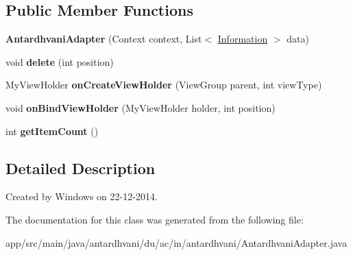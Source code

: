 \subsection*{Public Member Functions}
\begin{DoxyCompactItemize}
\item 
\hypertarget{classantardhvani_1_1du_1_1ac_1_1in_1_1antardhvani_1_1_antardhvani_adapter_a1ea0443eda01dfb34c46a8be5017ef73}{}{\bfseries Antardhvani\+Adapter} (Context context, List$<$ \hyperlink{classantardhvani_1_1du_1_1ac_1_1in_1_1antardhvani_1_1_information}{Information} $>$ data)\label{classantardhvani_1_1du_1_1ac_1_1in_1_1antardhvani_1_1_antardhvani_adapter_a1ea0443eda01dfb34c46a8be5017ef73}

\item 
\hypertarget{classantardhvani_1_1du_1_1ac_1_1in_1_1antardhvani_1_1_antardhvani_adapter_a9626fb4cb8885ae56a86a0c47f97c27a}{}void {\bfseries delete} (int position)\label{classantardhvani_1_1du_1_1ac_1_1in_1_1antardhvani_1_1_antardhvani_adapter_a9626fb4cb8885ae56a86a0c47f97c27a}

\item 
\hypertarget{classantardhvani_1_1du_1_1ac_1_1in_1_1antardhvani_1_1_antardhvani_adapter_ad95caba4acee29fc5eb588405a79fd54}{}My\+View\+Holder {\bfseries on\+Create\+View\+Holder} (View\+Group parent, int view\+Type)\label{classantardhvani_1_1du_1_1ac_1_1in_1_1antardhvani_1_1_antardhvani_adapter_ad95caba4acee29fc5eb588405a79fd54}

\item 
\hypertarget{classantardhvani_1_1du_1_1ac_1_1in_1_1antardhvani_1_1_antardhvani_adapter_a663771730165ddb08d8ea188ef5458bb}{}void {\bfseries on\+Bind\+View\+Holder} (My\+View\+Holder holder, int position)\label{classantardhvani_1_1du_1_1ac_1_1in_1_1antardhvani_1_1_antardhvani_adapter_a663771730165ddb08d8ea188ef5458bb}

\item 
\hypertarget{classantardhvani_1_1du_1_1ac_1_1in_1_1antardhvani_1_1_antardhvani_adapter_ab0b43c1a51a8558d4011acdb00ebd65b}{}int {\bfseries get\+Item\+Count} ()\label{classantardhvani_1_1du_1_1ac_1_1in_1_1antardhvani_1_1_antardhvani_adapter_ab0b43c1a51a8558d4011acdb00ebd65b}

\end{DoxyCompactItemize}


\subsection{Detailed Description}
Created by Windows on 22-\/12-\/2014. 

The documentation for this class was generated from the following file\+:\begin{DoxyCompactItemize}
\item 
app/src/main/java/antardhvani/du/ac/in/antardhvani/Antardhvani\+Adapter.\+java\end{DoxyCompactItemize}
